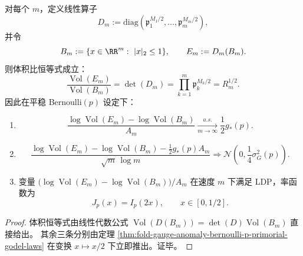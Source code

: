 \begin{proposition}[素数寄存器诱导的随机椭球体积律]\label{prop:fold-gauge-anomaly-godel-ellipsoid-volume}
对每个 \(m\)，定义线性算子
\[
D_m:=\mathrm{diag}\!\left(\mathfrak p_1^{M_1/2},\dots,\mathfrak p_m^{M_m/2}\right),
\]
并令
\[
B_m:=\{x\in\RR^m:\ |x|_2\le1\},\qquad E_m:=D_m(B_m).
\]
则体积比恒等式成立：
\[
\frac{\operatorname{Vol}(E_m)}{\operatorname{Vol}(B_m)}
=\det(D_m)
=\prod_{k=1}^{m}\mathfrak p_k^{M_k/2}
=R_m^{1/2}.
\]
因此在平稳 Bernoulli\((p)\) 设定下：
\begin{enumerate}
  \item \[
  \frac{\log\operatorname{Vol}(E_m)-\log\operatorname{Vol}(B_m)}{A_m}
  \xrightarrow[m\to\infty]{a.s.}
  \frac12 g_\ast(p).
  \]
  \item \[
  \frac{\log\operatorname{Vol}(E_m)-\log\operatorname{Vol}(B_m)-\frac12 g_\ast(p)A_m}
  {\sqrt m\,\log m}
  \Rightarrow
  \mathcal N\!\left(0,\frac14\sigma_G^2(p)\right).
  \]
  \item 变量
  \(
  \bigl(\log\operatorname{Vol}(E_m)-\log\operatorname{Vol}(B_m)\bigr)/A_m
  \)
  在速度 \(m\) 下满足 LDP，率函数为
  \[
  J_p(x)=I_p(2x),\qquad x\in[0,1/2].
  \]
\end{enumerate}
\end{proposition}
\begin{proof}
体积恒等式由线性代数公式
\(
\operatorname{Vol}(D(B_m))=\det(D)\operatorname{Vol}(B_m)
\)
直接给出。
其余三条分别由定理
\ref{thm:fold-gauge-anomaly-bernoulli-p-primorial-godel-laws}
在变换 \(x\mapsto x/2\) 下立即推出。证毕。
\end{proof}


